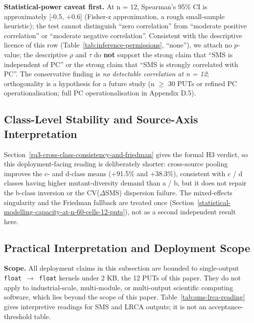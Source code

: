 \documentclass[manuscript,screen,review]{acmart}
\begin{document}
\textbf{Statistical-power caveat first.} At n = 12, Spearman's 95\% CI
is approximately {[}-0.5, +0.6{]} (Fisher-z approximation, a rough
small-sample heuristic); the test cannot distinguish ``zero
correlation'' from ``moderate positive correlation'' or ``moderate
negative correlation''. Consistent with the descriptive licence of this
row (Table~\ref{tab:inference-permissions}, ``none''), we attach no
$p$-value; the descriptive $\rho$ and $\tau$ do \textbf{not} support the
strong claim that ``SMS is independent of PC'' or the strong claim that
``SMS is strongly correlated with PC''. The conservative finding is
\emph{no detectable correlation at n = 12}; orthogonality is a
hypothesis for a future study (n $\geq$ 30 PUTs or refined PC operationalisation; full PC
operationalisation in Appendix D.5).

\subsection{Class-Level Stability and Source-Axis Interpretation}\label{h4-partial-across-same-source-and-cross-source}

Section~\ref{rq3-cross-class-consistency-and-friedman} gives the formal
H3 verdict, so this deployment-facing reading is deliberately shorter:
cross-source pooling improves the c- and d-class means (+91.5\% and
+38.3\%), consistent with c / d classes having higher mutant-diversity
demand than a / b, but it does not repair the b-class inversion or the
CV($\Delta$SMS) dispersion failure. The mixed-effects singularity and the
Friedman fallback are treated once (Section~\ref{statistical-modelling-capacity-at-n-60-cells-12-puts}),
not as a second independent result here.

\subsection{Practical Interpretation and Deployment Scope}\label{stakeholder-analysis-single-output-kernels-scope}

\textbf{Scope.} All deployment claims in this subsection are bounded to
single-output \texttt{float\ $\to$\ float} kernels under 2 KB, the 12 PUTs
of this paper. They do not apply to industrial-scale, multi-module, or
multi-output scientific computing software, which lies beyond the scope of this paper.
Table~\ref{tab:sms-lrca-reading} gives interpretive readings for SMS and
LRCA outputs; it is not an acceptance-threshold table.
\end{document}
